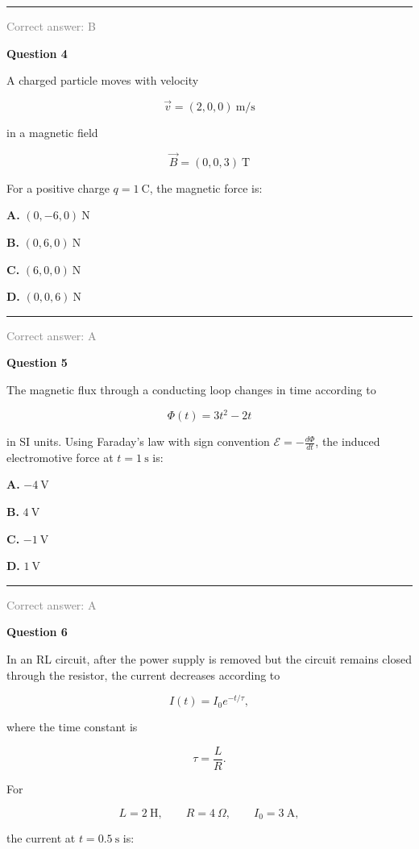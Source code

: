 \documentclass[11pt,a4paper]{article}
\newcommand{\answernote}[1]{%
\vfill
\noindent\textcolor{gray}{\rule{\linewidth}{0.4pt}}

{\small\textcolor{gray}{Correct answer: #1}}
}
\begin{document}
\answernote{B}
\newpage

{\LARGE\textbf{Question 4}}

A charged particle moves with velocity

\[
\vec v=(2,0,0)\ \mathrm{m/s}
\]

in a magnetic field

\[
\vec B=(0,0,3)\ \mathrm{T}
\]

For a positive charge $q=1\ \mathrm{C}$, the magnetic force is:

\vspace{0.5em}

{\large
\textbf{A.} $(0,-6,0)\ \mathrm{N}$

\textbf{B.} $(0,6,0)\ \mathrm{N}$

\textbf{C.} $(6,0,0)\ \mathrm{N}$

\textbf{D.} $(0,0,6)\ \mathrm{N}$
}

\answernote{A}
\newpage

{\LARGE\textbf{Question 5}}

The magnetic flux through a conducting loop changes in time according to

\[
\Phi(t)=3t^2-2t
\]

in SI units. Using Faraday's law with sign convention $\mathcal E=-\frac{d\Phi}{dt}$, the induced electromotive force at $t=1\ \mathrm{s}$ is:

\vspace{0.5em}

{\large
\textbf{A.} $-4\ \mathrm{V}$

\textbf{B.} $4\ \mathrm{V}$

\textbf{C.} $-1\ \mathrm{V}$

\textbf{D.} $1\ \mathrm{V}$
}

\answernote{A}
\newpage

{\LARGE\textbf{Question 6}}

In an RL circuit, after the power supply is removed but the circuit remains closed through the resistor, the current decreases according to

\[
I(t)=I_0 e^{-t/\tau},
\]

where the time constant is

\[
\tau=\frac{L}{R}.
\]

For

\[
L=2\ \mathrm{H}, \qquad R=4\ \Omega, \qquad I_0=3\ \mathrm{A},
\]

the current at $t=0.5\ \mathrm{s}$ is:

\vspace{0.5em}
\end{document}

